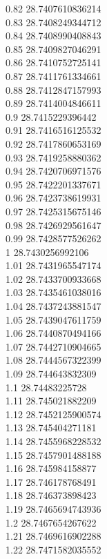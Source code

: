 {0.82	28.7407610836214\\
0.83	28.7408249344712\\
0.84	28.7408990408843\\
0.85	28.7409827046291\\
0.86	28.7410752725141\\
0.87	28.7411761334661\\
0.88	28.7412847157993\\
0.89	28.7414004846611\\
0.9	28.7415229396442\\
0.91	28.7416516125532\\
0.92	28.7417860653169\\
0.93	28.7419258880362\\
0.94	28.7420706971576\\
0.95	28.7422201337671\\
0.96	28.7423738619931\\
0.97	28.7425315675146\\
0.98	28.7426929561647\\
0.99	28.7428577526262\\
1	28.7430256992106\\
1.01	28.7431965547174\\
1.02	28.7433700933668\\
1.03	28.7435461038016\\
1.04	28.7437243881547\\
1.05	28.7439047611759\\
1.06	28.7440870494166\\
1.07	28.7442710904665\\
1.08	28.7444567322399\\
1.09	28.744643832309\\
1.1	28.74483225728\\
1.11	28.745021882209\\
1.12	28.7452125900574\\
1.13	28.745404271181\\
1.14	28.7455968228532\\
1.15	28.7457901488188\\
1.16	28.745984158877\\
1.17	28.746178768491\\
1.18	28.746373898423\\
1.19	28.7465694743936\\
1.2	28.7467654267622\\
1.21	28.7469616902288\\
1.22	28.7471582035552\\
}
